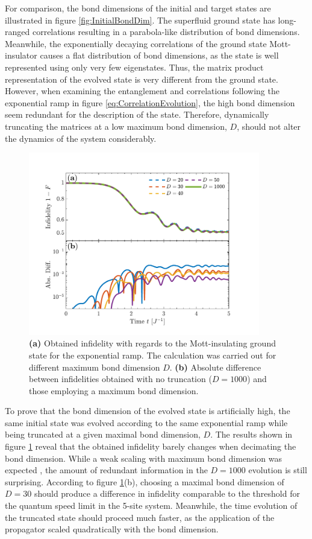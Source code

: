 For comparison, the bond dimensions of the initial and target states are illustrated in figure \ref{fig:InitialBondDim}. The superfluid ground state has long-ranged correlations resulting in a parabola-like distribution of bond dimensions. Meanwhile, the exponentially decaying correlations of the ground state Mott-insulator causes a flat distribution of bond dimensions, as the state is well represented using only very few eigenstates. Thus, the matrix product representation of the evolved state is very different from the ground state. However, when examining the entanglement and correlations following the exponential ramp in figure \ref{eq:CorrelationEvolution}, the high bond dimension seem redundant for the description of the state. Therefore, dynamically truncating the matrices at a low maximum bond dimension, $D$, should not alter the dynamics of the system considerably.

\begin{figure}[h!]
    \centering
    \includegraphics[width=0.9\textwidth]{Figures/L20/FidelityTruncation.pdf}
    \caption{ \textbf{(a)} Obtained infidelity with regards to the Mott-insulating ground state for the exponential ramp. The calculation was carried out for different maximum bond dimension $D$. \textbf{(b)} Absolute difference between infidelities obtained with no truncation ($D = 1000$) and those employing a maximum bond dimension.  }
    \label{fig:FidelityTruncation}
\end{figure}
To prove that the bond dimension of the evolved state is artificially high, the same initial state was evolved according to the same exponential ramp while being truncated at a given maximal bond dimension, $D$. The results shown in figure \ref{fig:FidelityTruncation} reveal that the obtained infidelity barely changes when decimating the bond dimension. While a weak scaling with maximum bond dimension was expected \cite{Daley2004}, the amount of redundant information in the $D = 1000$ evolution is still surprising. According to figure \ref{fig:FidelityTruncation}(b), choosing a maximal bond dimension of $D = 30$ should produce a difference in infidelity comparable to the threshold for the quantum speed limit in the 5-site system. Meanwhile, the time evolution of the truncated state should proceed much faster, as the application of the propagator scaled quadratically with the bond dimension.

